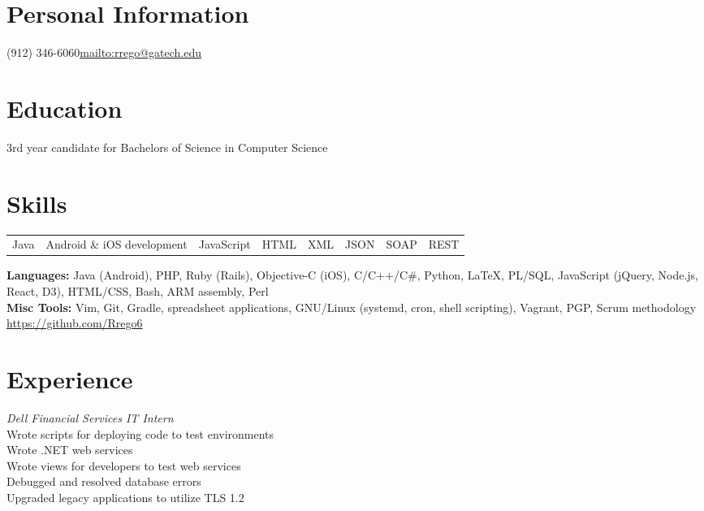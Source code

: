 \documentclass[line, margin]{resume}
\begin{document}
\section{Personal Information}

 {(912) 346-6060}{\href{rrego@gatech.edu}{mailto:rrego@gatech.edu}}

\section{Education}

3rd year candidate for Bachelors of Science in Computer Science\\

\section{Skills}

\begin{tabular}{l l l l} Java & Android \& iOS development & JavaScript & HTML &
XML & JSON & SOAP & REST \end{tabular}

\textbf{Languages:} Java (Android), PHP, Ruby (Rails), Objective-C (iOS), C/C++/C\#, Python, LaTeX, PL/SQL, JavaScript (jQuery, Node.js, React, D3), HTML/CSS, Bash, ARM assembly, Perl \\

\textbf{Misc Tools:} Vim, Git, Gradle, spreadsheet applications, GNU/Linux (systemd, cron, shell scripting), Vagrant, PGP, Scrum methodology\\
\url{https://github.com/Rrego6}

\section{Experience}
\textit{Dell Financial Services IT Intern} \\
Wrote scripts for deploying code to test environments \\
Wrote .NET web services \\
Wrote views for developers to test web services \\
Debugged and resolved database errors \\
Upgraded legacy applications to utilize TLS 1.2
\end{document}
